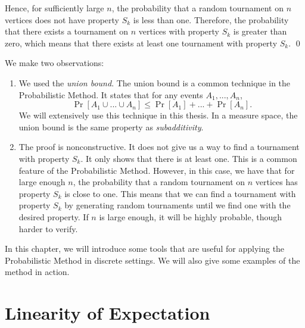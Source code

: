 Hence, for sufficiently large $n$, the probability that a random tournament on $n$ vertices does not have property $S_k$ is less than one. Therefore, the probability that there exists a tournament on $n$ vertices with property $S_k$ is greater than zero, which means that there exists at least one tournament with property $S_k$. \qed

We make two observations: 
\begin{enumerate}
    \item We used the \textit{union bound}. The union bound is a common technique in the Probabilistic Method. It states that for any events $A_1, ..., A_n$,
    \[\Pr[A_1 \cup ... \cup A_n] \leq \Pr[A_1] + ... + \Pr[A_n].\]
    We will extensively use this technique in this thesis. In a measure space, the union bound is the same property as \textit{subadditivity}. \par
    \item The proof is nonconstructive. It does not give us a way to find a tournament with property $S_k$. It only shows that there is at least one. This is a common feature of the Probabilistic Method. However, in this case, we have that for large enough $n$, the probability that a random tournament on $n$ vertices has property $S_k$ is close to one. This means that we can find a tournament with property $S_k$ by generating random tournaments until we find one with the desired property. If $n$ is large enough, it will be highly probable, though harder to verify. \par
\end{enumerate}
In this chapter, we will introduce some tools that are useful for applying the Probabilistic Method in discrete settings. We will also give some examples of the method in action. \par

\section{Linearity of Expectation}\label{sec:probmet:linearity}

